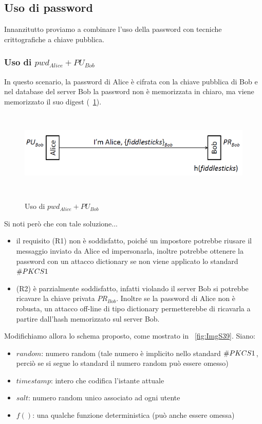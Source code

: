 \subsection{Uso di password}
Innanzitutto proviamo a combinare l'uso della password con tecniche crittografiche a chiave pubblica.
\subsubsection{Uso di $pwd_{Alice} + PU_{Bob}$}
In questo scenario, la password di Alice è cifrata con la chiave pubblica di Bob e nel database del server Bob la password non è memorizzata in chiaro, ma viene memorizzato il suo digest (\figurename~\ref{fig:ImgS37}).
\begin{figure}[htbp]
	\centering%
	\subfigure%
	{\includegraphics[height=4cm, width=12cm, keepaspectratio]{Immagini/autenticazione/ImgS37.png}}
	\caption{Uso di $pwd_{Alice} + PU_{Bob}$\label{fig:ImgS37}} 	
\end{figure}
Si noti però che con tale soluzione...
\begin{itemize}
	\item il requisito (R1) non è soddisfatto, poiché un impostore potrebbe riusare il messaggio inviato da Alice ed
	impersonarla, inoltre potrebbe ottenere la password con un attacco dictionary se non viene applicato lo standard $\symbol{35}PKCS1$
	\item (R2) è parzialmente soddisfatto, infatti violando il server Bob si potrebbe ricavare la chiave privata $PR_{Bob}$. Inoltre se la password di Alice non è robusta, un attacco off-line di tipo dictionary permetterebbe di ricavarla a partire dall'hash memorizzato sul server Bob.
\end{itemize}
Modifichiamo allora lo schema proposto, come mostrato in \figurename~\ref{fig:ImgS39}. Siano:
\begin{itemize}
	\item $random$: numero random (tale numero è implicito nello standard $\symbol{35}PKCS1$, perciò se si segue lo standard il numero random può essere omesso)
	\item $timestamp$: intero che codifica l'istante attuale
	\item $salt$: numero random unico associato ad ogni utente
	\item $f()$: una qualche funzione deterministica (può anche essere omessa)
\end{itemize} 
